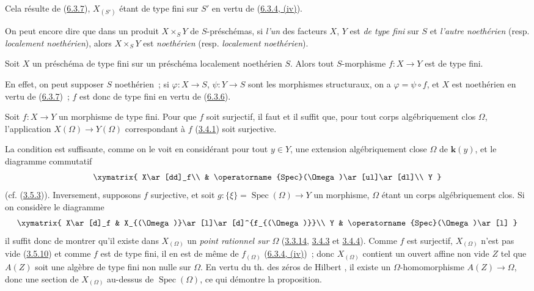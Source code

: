 Cela résulte de (\hyperref[I.6.3.7-fr]{6.3.7}), $X_{(S')}$ étant de type fini
sur $S'$ en vertu de (\hyperref[I.6.3.4-fr]{6.3.4, (iv)}).

On peut encore dire que dans un produit $X\times_S Y$ de $S$-préschémas, si
\emph{l'un} des
facteurs $X$, $Y$ est \emph{de type fini} sur $S$ et
\emph{l'autre noethérien} (resp. \emph{localement noethérien}), alors
$X\times_S Y$ est \emph{noethérien} (resp. \emph{localement noethérien}).

\begin{corollary}[6.3.9]
\label{I.6.3.9-fr}
Soit $X$ un préschéma de type fini sur un préschéma localement noethérien $S$.
Alors tout $S$-morphisme $f:X\to Y$ est de type fini.
\end{corollary}

En effet, on peut supposer $S$ noethérien~; si $\varphi:X\to S$,
$\psi:Y\to S$ sont les morphismes structuraux, on a $\varphi=\psi\circ f$, et
$X$ est noethérien en vertu de (\hyperref[I.6.3.7-fr]{6.3.7})~; $f$ est donc
de type fini en vertu de (\hyperref[I.6.3.6-fr]{6.3.6}).

\begin{proposition}[6.3.10]
\label{I.6.3.10-fr}
Soit $f:X\to Y$ un morphisme de type fini. Pour que $f$ soit surjectif, il faut
et il suffit que, pour tout corps \textup{algébriquement clos} $\Omega$, l'application
$X(\Omega)\to Y(\Omega)$ correspondant à $f$
\textup{(\hyperref[I.3.4.1-fr]{3.4.1})} soit surjective.
\end{proposition}

La condition est suffisante, comme on le voit en considérant pour tout
$y\in Y$, une extension algébriquement close $\Omega$ de $\boldsymbol{k}(y)$, et le
diagramme commutatif
\[
  \xymatrix{
    X\ar[dd]_f\\
    & \operatorname{Spec}(\Omega)\ar[ul]\ar[dl]\\
    Y
  }
\]
(cf. (\hyperref[I.3.5.3-fr]{3.5.3})). Inversement, supposons $f$
surjective, et soit $g:\{\xi\}=\operatorname{Spec}(\Omega)\to Y$ un morphisme,
$\Omega$ étant un corps algébriquement clos. Si on considère le diagramme
\[
  \xymatrix{
    X\ar[d]_f &
    X_{(\Omega)}\ar[l]\ar[d]^{f_{(\Omega)}}\\
    Y &
    \operatorname{Spec}(\Omega)\ar[l]
  }
\]
il suffit donc de montrer qu'il existe dans $X_{(\Omega)}$ un
\emph{point rationnel sur $\Omega$}
(\hyperref[I.3.3.14-fr]{3.3.14}, \hyperref[I.3.4.3-fr]{3.4.3} et
\hyperref[I.3.4.4-fr]{3.4.4}). Comme $f$ est surjectif, $X_{(\Omega)}$ n'est
pas vide (\hyperref[I.3.5.10-fr]{3.5.10}) et comme $f$ est de type fini, il en
est de même de $f_{(\Omega)}$ (\hyperref[I.6.3.4-fr]{6.3.4, (iv)})~; donc
$X_{(\Omega)}$ contient un ouvert affine non vide $Z$ tel que $A(Z)$ soit une
algèbre de type fini non nulle sur $\Omega$. En vertu du th. des zéros de
Hilbert \cite{I-21}, il existe un $\Omega$-homomorphisme $A(Z)\to\Omega$, donc
une section de $X_{(\Omega)}$ au-dessus de $\operatorname{Spec}(\Omega)$, ce
qui démontre la proposition.

